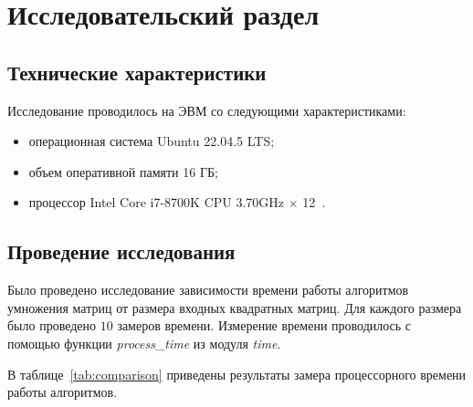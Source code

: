 \chapter{Исследовательский раздел}

\section{Технические характеристики}

Исследование проводилось на ЭВМ со следующими характеристиками:
\begin{itemize}[label=--]
    \item операционная система Ubuntu 22.04.5 LTS;
    \item объем оперативной памяти 16 ГБ;
    \item процессор Intel Core i7-8700K CPU 3.70GHz × 12~\cite{processor}.
\end{itemize}

\section{Проведение исследования}

Было проведено исследование зависимости времени работы алгоритмов умножения матриц от размера входных квадратных матриц. Для каждого размера было проведено $10$ замеров времени. Измерение времени проводилось с помощью функции \textit{process\_time} из модуля \textit{time}.

В таблице~\ref{tab:comparison} приведены результаты замера процессорного времени работы алгоритмов.

